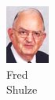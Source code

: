 \begin{figure}[H]
\begin{subfigure}[b]{0.1\textwidth}
                \includegraphics[width=\textwidth]{mugs/ShulzeFred}
                \caption*{Fred \\ Shulze}
        \end{subfigure}
                ~ %
        \begin{subfigure}[b]{0.1\textwidth}

\end{subfigure}
\end{figure}
